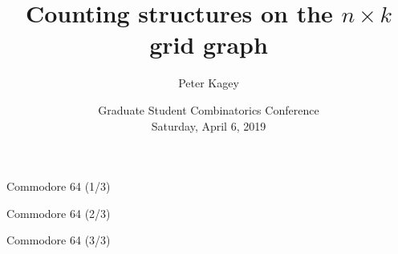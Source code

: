\documentclass{beamer}%
\title{Counting structures on the $n \times k$ grid graph}
\author{Peter Kagey}
\institute{University of Southern California}
\date[]{
  Graduate Student Combinatorics Conference\\
  Saturday, April 6, 2019
}
\begin{document}
\begin{frame}
  \titlepage
\end{frame}

\begin{frame}{Commodore 64 (1/3)} %
\end{frame}

\begin{frame}{Commodore 64 (2/3)} %
\end{frame}

\begin{frame}{Commodore 64 (3/3)} %
\end{frame}
\end{document}
